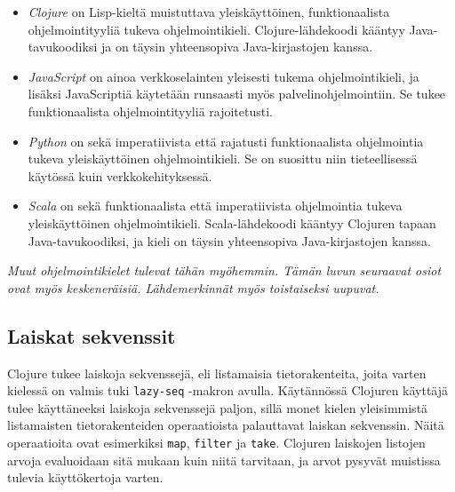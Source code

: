 \begin{itemize}

\item\textit{Clojure} on Lisp-kieltä muistuttava yleiskäyttöinen, funktionaalista ohjelmointityyliä tukeva ohjelmointikieli. Clojure-lähdekoodi kääntyy Java-tavukoodiksi ja on täysin yhteensopiva Java-kirjastojen kanssa.

\item \textit{JavaScript} on ainoa verkkoselainten yleisesti tukema ohjelmointikieli, ja lisäksi JavaScriptiä käytetään runsaasti myös palvelinohjelmointiin. Se tukee funktionaalista ohjelmointityyliä rajoitetusti.

\item\textit{Python} on sekä imperatiivista että rajatusti funktionaalista ohjelmointia tukeva yleiskäyttöinen ohjelmointikieli. Se on suosittu niin tieteellisessä käytössä kuin verkkokehityksessä.

\item\textit{Scala} on sekä funktionaalista että imperatiivista ohjelmointia tukeva yleiskäyttöinen ohjelmointikieli. Scala-lähdekoodi kääntyy Clojuren tapaan Java-tavukoodiksi, ja kieli on täysin yhteensopiva Java-kirjastojen kanssa.

\end{itemize}

\textit{Muut ohjelmointikielet tulevat tähän myöhemmin. Tämän luvun seuraavat osiot ovat myös keskeneräisiä. Lähdemerkinnät myös toistaiseksi uupuvat.}

\subsection{Laiskat sekvenssit}

Clojure tukee laiskoja sekvenssejä, eli listamaisia tietorakenteita, joita varten kielessä on valmis tuki \verb!lazy-seq! -makron avulla. Käytännössä Clojuren käyttäjä tulee käyttäneeksi laiskoja sekvenssejä paljon, sillä monet kielen yleisimmistä listamaisten tietorakenteiden operaatioista palauttavat laiskan sekvenssin. Näitä operaatioita ovat esimerkiksi \verb!map!, \verb!filter! ja \verb!take!. Clojuren laiskojen listojen arvoja evaluoidaan sitä mukaan kuin niitä tarvitaan, ja arvot pysyvät muistissa tulevia käyttökertoja varten.


